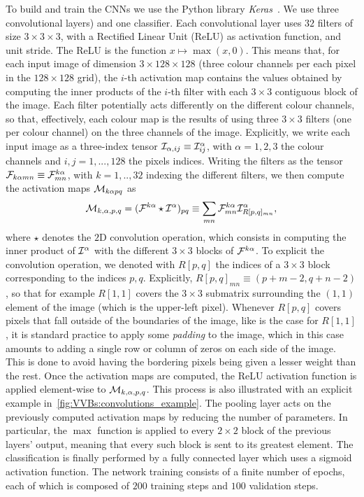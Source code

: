 To build and train the \acp{CNN} we use the Python library \emph{Keras}~\cite{chollet2015keras}.
We use three convolutional layers) and one classifier. Each convolutional layer uses $32$ filters of size $3 \times 3 \times 3$, with a Rectified Linear Unit (ReLU) as activation function, and unit stride. The ReLU is the function $x\mapsto \max(x,0)$.
This means that, for each input image of dimension $3\times 128\times128$ (three colour channels per each pixel in the $128\times128$ grid), the $i$-th activation map contains the values obtained by computing the inner products of the $i$-th filter with each $3\times 3$ contiguous block of the image. Each filter potentially acts differently on the different colour channels, so that, effectively, each colour map is the results of using three $3\times3$ filters (one per colour channel) on the three channels of the image.
Explicitly, we write each input image as a three-index tensor ${\mathcal{I}}_{\alpha,ij}\equiv{\mathcal{I}}^\alpha_{ij}$, with $\alpha=1,2,3$ the colour channels and $i,j=1,...,128$ the pixels indices.
Writing the filters as the tensor ${\mathcal{F}}_{k\alpha mn}\equiv{\mathcal{F}}^{k\alpha}_{mn}$, with $k=1,..,32$ indexing the different filters, we then compute the activation maps ${\mathcal{M}}_{k\alpha pq}$ as
\begin{equation}
	{\mathcal{M}}_{k,\alpha, p,q} = ({\mathcal{F}}^{k\alpha}\star{\mathcal{I}}^{\alpha})_{pq} \equiv
	\sum_{mn} {\mathcal{F}}^{k\alpha}_{mn} {\mathcal{I}}^\alpha_{R[p,q]_{mn}},
\end{equation}
where $\star$ denotes the $2$D convolution operation, which consists in computing the inner product of ${\mathcal{I}}^\alpha$ with the different $3\times3$ blocks of ${\mathcal{F}}^{k\alpha}$. To explicit the convolution operation, we denoted with $R[p,q]$ the indices of a $3\times3$ block corresponding to the indices $p,q$.
Explicitly, $R[p,q]_{mn}\equiv (p+m-2,q+n-2)$, so that for example $R[1,1]$ covers the $3\times3$ submatrix surrounding the $(1,1)$ element of the image (which is the upper-left pixel). Whenever $R[p,q]$ covers pixels that fall outside of the boundaries of the image, like is the case for $R[1,1]$, it is standard practice to apply some \emph{padding} to the image, which in this case amounts to adding a single row or column of zeros on each side of the image. This is done to avoid having the bordering pixels being given a lesser weight than the rest.
Once the activation maps are computed, the ReLU activation function is applied element-wise to ${\mathcal{M}}_{k,\alpha, p,q}$.
This process is also illustrated with an explicit example in~\cref{fig:VVBs:convolutions_example}.
The pooling layer acts on the previously computed activation maps by reducing the number of parameters. In particular, the $\max$ function is applied to every $2\times2$ block of the previous layers' output, meaning that every such block is sent to its greatest element.
The classification is finally performed by a fully connected layer which uses a sigmoid activation function. The network training consists of a finite number of epochs, each of which is composed of $200$ training steps and $100$ validation steps.

